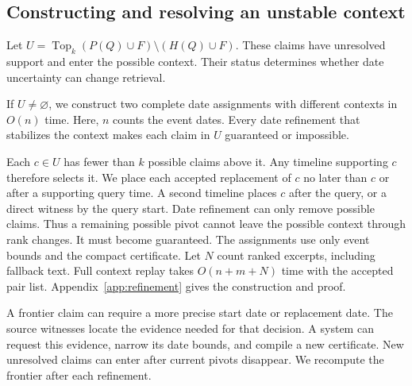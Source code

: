 \subsection{Constructing and resolving an unstable context}
Let $U=\operatorname{Top}_k(P(Q)\cup F)\setminus(H(Q)\cup F)$.
These claims have unresolved support and enter the possible context.
Their status determines whether date uncertainty can change retrieval.

\begin{theorem}
\label{thm:refinement}
If $U\ne\varnothing$, we construct two complete date assignments with different contexts in $O(n)$ time.
Here, $n$ counts the event dates.
Every date refinement that stabilizes the context makes each claim in $U$ guaranteed or impossible.
\end{theorem}

Each $c\in U$ has fewer than $k$ possible claims above it.
Any timeline supporting $c$ therefore selects it.
We place each accepted replacement of $c$ no later than $c$ or after a supporting query time.
A second timeline places $c$ after the query, or a direct witness by the query start.
Date refinement can only remove possible claims.
Thus a remaining possible pivot cannot leave the possible context through rank changes.
It must become guaranteed.
The assignments use only event bounds and the compact certificate.
Let $N$ count ranked excerpts, including fallback text.
Full context replay takes $O(n+m+N)$ time with the accepted pair list.
Appendix~\ref{app:refinement} gives the construction and proof.

A frontier claim can require a more precise start date or replacement date.
The source witnesses locate the evidence needed for that decision.
A system can request this evidence, narrow its date bounds, and compile a new certificate.
New unresolved claims can enter after current pivots disappear.
We recompute the frontier after each refinement.

